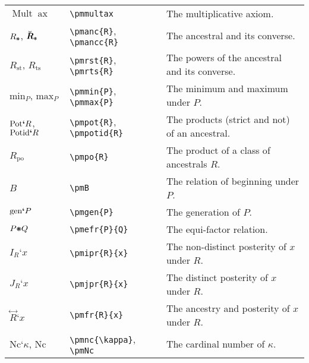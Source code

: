 \documentclass[12pt]{article}
\newcommand{\pmast}{\text{\resizebox{!}{.75\height}{\ding{107}}}} %
\newcommand{\pmbreve}[1]{\boldsymbol{\breve{\text{$#1$}}}}
\newcommand{\pmcrel}[1]{\pmbreve{#1}} %
\newcommand{\pmmultax}{\mathop{\text{Mult}} \mathop{\text{ax}}} %
\newcommand{\pmanc}[1]{#1_\pmast} %
\newcommand{\pmancc}[1]{\pmcrel{#1}_\pmast} %
\newcommand{\pmrst}[1]{#1_\text{st}} %
\newcommand{\pmrts}[1]{#1_\text{ts}} %
\newcommand{\pmpot}[1]{\text{Pot}\boldsymbol{`}#1} %
\newcommand{\pmpotid}[1]{\text{Potid}\boldsymbol{`}#1} %
\newcommand{\pmpo}[1]{#1_\text{po}} %
\newcommand{\pmB}{B} %
\newcommand{\pmmin}[1]{\text{min}_{#1}} %
\newcommand{\pmmax}[1]{\text{max}_{#1}} %
\newcommand{\pmgen}[1]{\text{gen}\boldsymbol{`}#1} %
\newcommand{\pmefr}[2]{#1\pmast#2} %
\newcommand{\pmipr}[2]{I_{#1}\textbf{`}#2} %
\newcommand{\pmjpr}[2]{J_{#1}\textbf{`}#2} %
\newcommand{\pmfr}[2]{\overset{\boldsymbol{\leftrightarrow}}{#1}\textbf{`}#2} %
\newcommand{\pmnc}[1]{\text{Nc}\textbf{`}#1} %
\newcommand{\pmNc}{\text{Nc}}
\begin{document}
\begin{tabular}{@{}p{3cm} | p{5cm} | p{8.25cm}}
	$\pmmultax$ & \verb|\pmmultax| & The multiplicative axiom. \\
	$\pmanc{R}$, $\pmancc{R}$ & \verb|\pmanc{R}|, \verb|\pmancc{R}| & The ancestral and its converse. \\
	$\pmrst{R}$, $\pmrts{R}$ & \verb|\pmrst{R}|, \verb|\pmrts{R}| & The powers of the ancestral and its converse. \\
	$\pmmin{P}$, $\pmmax{P}$ & \verb|\pmmin{P}|, \verb|\pmmax{P}| & The minimum and maximum under $P$. \\
	$\pmpot{R}$, $\pmpotid{R}$ & \verb|\pmpot{R}|, \verb|\pmpotid{R}| & The products (strict and not) of an ancestral. \\
	 $\pmpo{R}$ & \verb|\pmpo{R}| & The product of a class of ancestrals $R$. \\
	 $\pmB$ & \verb|\pmB| & The relation of beginning under $P$. \\
	$\pmgen{P}$ & \verb|\pmgen{P}| & The generation of $P$. \\
	$\pmefr{P}{Q}$ & \verb|\pmefr{P}{Q}| & The equi-factor relation. \\
	$\pmipr{R}{x}$ & \verb|\pmipr{R}{x}| &  The non-distinct posterity of $x$ under $R$. \\
	$\pmjpr{R}{x}$ & \verb|\pmjpr{R}{x}| &  The distinct posterity of $x$ under $R$. \\
	$\pmfr{R}{x}$ & \verb|\pmfr{R}{x}| & The ancestry and posterity of $x$ under $R$. \\
	$\pmnc{\kappa}$, $\pmNc$ & \verb|\pmnc{\kappa}|, \verb|\pmNc| & The cardinal number of $\kappa$.
\end{tabular}
\end{document}
